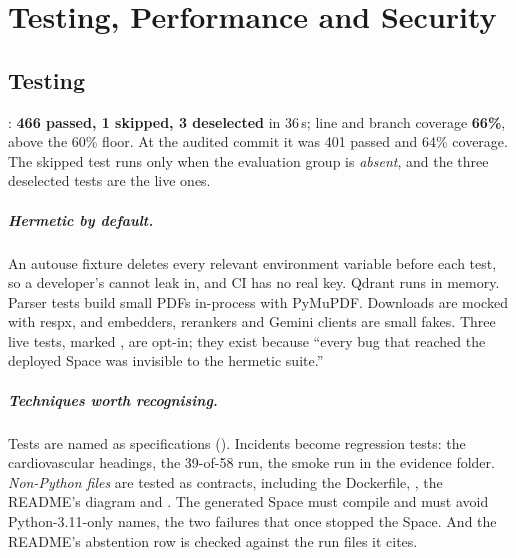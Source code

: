 \chapter{Testing, Performance and Security}
\label{ch:quality}

\section{Testing}
\label{sec:testing}

\begin{measured}
: \textbf{466 passed, 1 skipped, 3 deselected} in 36\,s; line and branch coverage \textbf{66\%}, above the 60\% floor. At the audited commit it was 401 passed and 64\% coverage. The skipped test runs only when the evaluation group is \emph{absent}, and the three deselected tests are the live ones.
\end{measured}

\paragraph{Hermetic by default.} An autouse fixture deletes every relevant environment variable before each test, so a developer's  cannot leak in, and CI has no real key. Qdrant runs in memory. Parser tests build small PDFs in-process with PyMuPDF. Downloads are mocked with respx, and embedders, rerankers and Gemini clients are small fakes. Three live tests, marked , are opt-in; they exist because ``every bug that reached the deployed Space was invisible to the hermetic suite.''

\paragraph{Techniques worth recognising.} Tests are named as specifications (). Incidents become regression tests: the cardiovascular headings, the 39-of-58 run, the smoke run in the evidence folder. \emph{Non-Python files} are tested as contracts, including the Dockerfile, , the README's diagram and . The generated Space  must compile and must avoid Python-3.11-only names, the two failures that once stopped the Space. And the README's abstention row is checked against the run files it cites.

